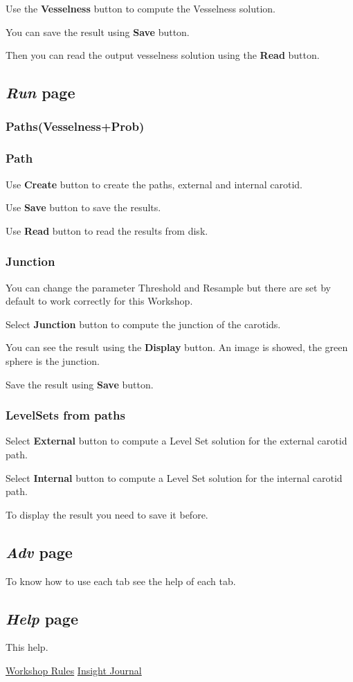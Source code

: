 \documentclass{article}
\begin{document}
Use the {\bf Vesselness} button to compute the Vesselness solution.


You can save the result using {\bf Save} button.


Then you can read the output vesselness solution using the {\bf Read} button.
\subsection{\emph{Run} page}
\subsubsection{Paths(Vesselness+Prob)}
\subsubsection{Path}
Use {\bf Create} button to create the paths, external and internal carotid.


Use {\bf Save} button to save the results.


Use {\bf Read} button to read the results from disk.
\subsubsection{Junction}
You can change the parameter Threshold and Resample but there are set by default to work correctly for this Workshop.


Select {\bf Junction} button to compute the junction of the carotids.


You can see the result using the {\bf Display} button. An image is showed, the green sphere is the junction.


Save the result using {\bf Save} button.
\subsubsection{LevelSets from paths}
Select {\bf External} button to compute a Level Set solution for the external carotid path.


Select {\bf Internal} button to compute a Level Set solution for the internal carotid path.


To display the result you need to save it before.

\subsection{\emph{Adv} page}
To know how to use each tab see the help of each tab.

\subsection{\emph{Help} page}
This help.

\begin{thebibliography}{1}
 \href{http://cls2009.bigr.nl/index.php}{Workshop Rules}
 \href{http://www.insight-journal.org/browse/publication/672}{Insight Journal}
\end{thebibliography}
\end{document}
